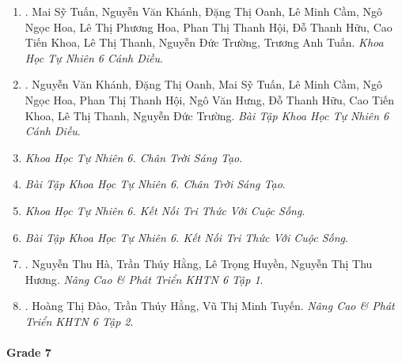 \documentclass{article}
\begin{document}
\begin{enumerate}
	\item \cite{SGK_KHTN_6_CD}. {\sc Mai Sỹ Tuấn, Nguyễn Văn Khánh, Đặng Thị Oanh, Lê Minh Cầm, Ngô Ngọc Hoa, Lê Thị Phương Hoa, Phan Thị Thanh Hội, Đỗ Thanh Hữu, Cao Tiến Khoa, Lê Thị Thanh, Nguyễn Đức Trường, Trương Anh Tuấn}. {\it Khoa Học Tự Nhiên 6 Cánh Diều}.\hfill{\sf[done]}
	
	\item \cite{SBT_KHTN_6_CD}. {\sc Nguyễn Văn Khánh, Đặng Thị Oanh, Mai Sỹ Tuấn, Lê Minh Cầm, Ngô Ngọc Hoa, Phan Thị Thanh Hội, Ngô Văn Hưng, Đỗ Thanh Hữu, Cao Tiến Khoa, Lê Thị Thanh, Nguyễn Đức Trường}. {\it Bài Tập Khoa Học Tự Nhiên 6 Cánh Diều}.\hfill{\sf[done]}
	
	\item {\it Khoa Học Tự Nhiên 6. Chân Trời Sáng Tạo}.
	
	\item {\it Bài Tập Khoa Học Tự Nhiên 6. Chân Trời Sáng Tạo}.
	
	\item {\it Khoa Học Tự Nhiên 6. Kết Nối Tri Thức Với Cuộc Sống}.
	
	\item {\it Bài Tập Khoa Học Tự Nhiên 6. Kết Nối Tri Thức Với Cuộc Sống}.
	
	\item \cite{ncpt_KHTN_6_tap_1}. {\sc Nguyễn Thu Hà, Trần Thúy Hằng, Lê Trọng Huyền, Nguyễn Thị Thu Hương}. {\it Nâng Cao \& Phát Triển KHTN 6 Tập 1}.\hfill{\sf[done]}
	
	\item \cite{ncpt_KHTN_6_tap_2}. {\sc Hoàng Thị Đào, Trần Thúy Hằng, Vũ Thị Minh Tuyến}. {\it Nâng Cao \& Phát Triển KHTN 6 Tập 2}.\hfill{\sf[done]}
\end{enumerate}

\paragraph{Grade 7}
\end{document}
